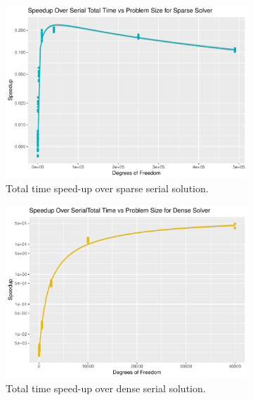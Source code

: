 \begin{figure}
	\centering
	\begin{subfigure}{0.48\linewidth}
		\centering
		\includegraphics[width = \linewidth]{Plots/total_sparse_cpu_speedup_vs_n}
		\caption{Total time speed-up over sparse serial solution.}
		\label{fig:tot_sparse}
	\end{subfigure}\hfill
	\begin{subfigure}{0.48\linewidth}
		\centering
		\includegraphics[width=\linewidth]{Plots/total_dense_cpu_speedup_vs_n}
		\caption{Total time speed-up over dense serial solution.}
		\label{fig:tot_dense}
	\end{subfigure}\\
	\begin{subfigure}{0.48\linewidth}
		\centering

\end{subfigure}
\end{figure}
